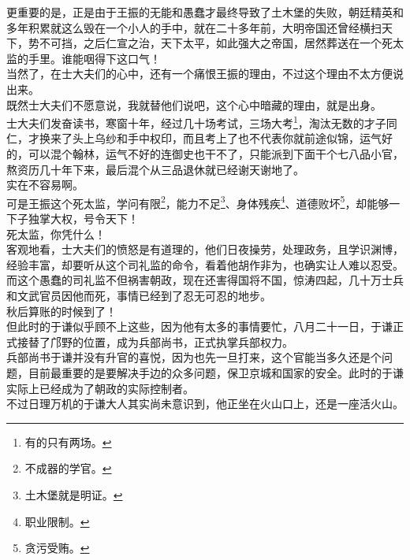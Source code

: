 \begin{multicols}{\theparacolNo}
更重要的是，正是由于王振的无能和愚蠢才最终导致了土木堡的失败，朝廷精英和多年积累就这么毁在一个小人的手中，就在二十多年前，大明帝国还曾经横扫天下，势不可挡，之后仁宣之治，天下太平，如此强大之帝国，居然葬送在一个死太监的手里。谁能咽得下这口气！\\

当然了，在士大夫们的心中，还有一个痛恨王振的理由，不过这个理由不太方便说出来。\\

既然士大夫们不愿意说，我就替他们说吧，这个心中暗藏的理由，就是出身。\\

士大夫们发奋读书，寒窗十年，经过几十场考试，三场大考\footnote{有的只有两场。}，淘汰无数的才子同仁，才换来了头上乌纱和手中权印，而且考上了也不代表你就前途似锦，运气好的，可以混个翰林，运气不好的连御史也干不了，只能派到下面干个七八品小官，熬资历几十年下来，最后混个从三品退休就已经谢天谢地了。\\

实在不容易啊。\\

可是王振这个死太监，学问有限\footnote{不成器的学官。}，能力不足\footnote{土木堡就是明证。}、身体残疾\footnote{职业限制。}、道德败坏\footnote{贪污受贿。}，却能够一下子独掌大权，号令天下！\\

死太监，你凭什么！\\

客观地看，士大夫们的愤怒是有道理的，他们日夜操劳，处理政务，且学识渊博，经验丰富，却要听从这个司礼监的命令，看着他胡作非为，也确实让人难以忍受。\\

而这个愚蠢的司礼监不但祸害朝政，现在还害得国将不国，惊涛四起，几十万士兵和文武官员因他而死，事情已经到了忍无可忍的地步。\\

秋后算账的时候到了！\\

但此时的于谦似乎顾不上这些，因为他有太多的事情要忙，八月二十一日，于谦正式接替了邝野的位置，成为兵部尚书，正式执掌兵部权力。\\

兵部尚书于谦并没有升官的喜悦，因为也先一旦打来，这个官能当多久还是个问题，目前最重要的是要解决手边的众多问题，保卫京城和国家的安全。此时的于谦实际上已经成为了朝政的实际控制者。\\

不过日理万机的于谦大人其实尚未意识到，他正坐在火山口上，还是一座活火山。\\


\end{multicols}
